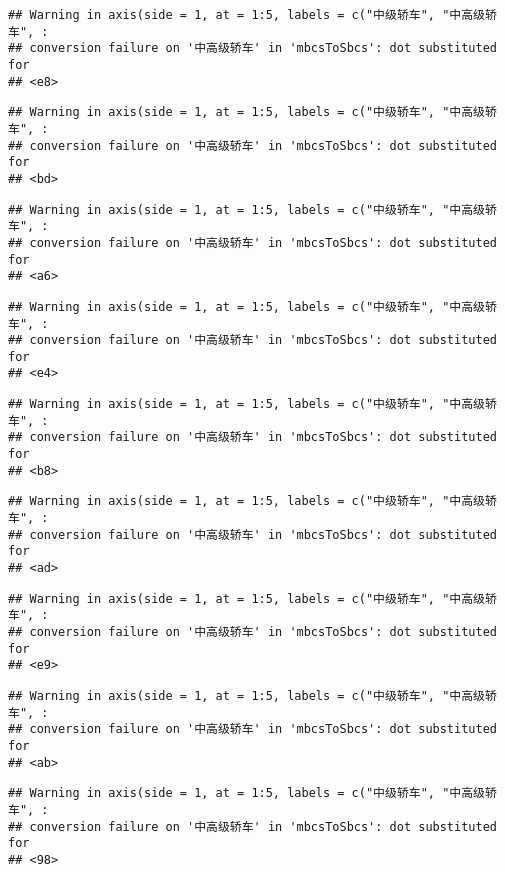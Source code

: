 \documentclass[]{article}
\begin{document}
\begin{verbatim}
## Warning in axis(side = 1, at = 1:5, labels = c("中级轿车", "中高级轿车", :
## conversion failure on '中高级轿车' in 'mbcsToSbcs': dot substituted for
## <e8>
\end{verbatim}

\begin{verbatim}
## Warning in axis(side = 1, at = 1:5, labels = c("中级轿车", "中高级轿车", :
## conversion failure on '中高级轿车' in 'mbcsToSbcs': dot substituted for
## <bd>
\end{verbatim}

\begin{verbatim}
## Warning in axis(side = 1, at = 1:5, labels = c("中级轿车", "中高级轿车", :
## conversion failure on '中高级轿车' in 'mbcsToSbcs': dot substituted for
## <a6>
\end{verbatim}

\begin{verbatim}
## Warning in axis(side = 1, at = 1:5, labels = c("中级轿车", "中高级轿车", :
## conversion failure on '中高级轿车' in 'mbcsToSbcs': dot substituted for
## <e4>
\end{verbatim}

\begin{verbatim}
## Warning in axis(side = 1, at = 1:5, labels = c("中级轿车", "中高级轿车", :
## conversion failure on '中高级轿车' in 'mbcsToSbcs': dot substituted for
## <b8>
\end{verbatim}

\begin{verbatim}
## Warning in axis(side = 1, at = 1:5, labels = c("中级轿车", "中高级轿车", :
## conversion failure on '中高级轿车' in 'mbcsToSbcs': dot substituted for
## <ad>
\end{verbatim}

\begin{verbatim}
## Warning in axis(side = 1, at = 1:5, labels = c("中级轿车", "中高级轿车", :
## conversion failure on '中高级轿车' in 'mbcsToSbcs': dot substituted for
## <e9>
\end{verbatim}

\begin{verbatim}
## Warning in axis(side = 1, at = 1:5, labels = c("中级轿车", "中高级轿车", :
## conversion failure on '中高级轿车' in 'mbcsToSbcs': dot substituted for
## <ab>
\end{verbatim}

\begin{verbatim}
## Warning in axis(side = 1, at = 1:5, labels = c("中级轿车", "中高级轿车", :
## conversion failure on '中高级轿车' in 'mbcsToSbcs': dot substituted for
## <98>
\end{verbatim}
\end{document}
